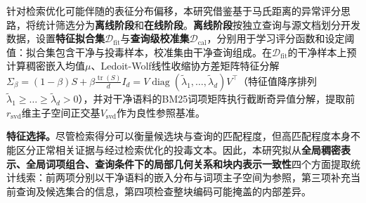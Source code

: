 针对检索优化可能伴随的表征分布偏移，本研究借鉴基于马氏距离的异常评分思路\cite{mahalanobis1936generalized,lee2018simple}，将统计筛选分为\textbf{离线阶段}和\textbf{在线阶段}。\textbf{离线阶段}按独立查询与源文档划分开发数据，设置\textbf{特征拟合集$\mathcal D_{\mathrm{fit}}$}与\textbf{查询级校准集$\mathcal D_{\mathrm{cal}}$}，分别用于学习评分函数和设定阈值：拟合集包含干净与投毒样本，校准集由干净查询组成。在$\mathcal D_{\mathrm{fit}}$的干净样本上预计算稠密嵌入均值$\mu$、Ledoit-Wolf线性收缩协方差矩阵特征分解$\Sigma_\beta=(1-\beta)S+\beta\frac{\operatorname{tr}(S)}{d}I_d=V\operatorname{diag}(\tilde\lambda_1,\dots,\tilde\lambda_d)V^\top$（特征值降序排列$\tilde\lambda_1\ge\dots\ge\tilde\lambda_d>0$）\cite{ledoit2004well}，并对干净语料的BM25词项矩阵\cite{robertson2009probabilistic}执行截断奇异值分解\cite{deerwester1990indexing}，提取前$r_{\mathrm{svd}}$维主子空间正交基$V_{\mathrm{svd}}$作为良性参照基准。

\textbf{特征选择。}尽管检索得分可以衡量候选块与查询的匹配程度，但高匹配程度本身不能区分正常相关证据与经过检索优化的投毒文本。因此，本研究拟从\textbf{全局稠密表示、全局词项组合、查询条件下的局部几何关系和块内表示一致性}四个方面提取统计线索：前两项分别以干净语料的嵌入分布与词项主子空间为参照，第三项补充当前查询及候选集合的信息，第四项检查整块编码可能掩盖的内部差异。

